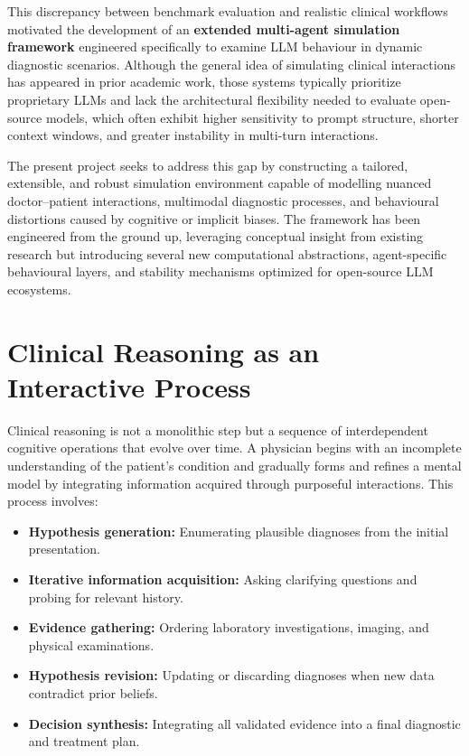 This discrepancy between benchmark evaluation and realistic clinical workflows motivated the development of an \textbf{extended multi-agent simulation framework} engineered specifically to examine LLM behaviour in dynamic diagnostic scenarios. Although the general idea of simulating clinical interactions has appeared in prior academic work, those systems typically prioritize proprietary LLMs and lack the architectural flexibility needed to evaluate open-source models, which often exhibit higher sensitivity to prompt structure, shorter context windows, and greater instability in multi-turn interactions.

The present project seeks to address this gap by constructing a tailored, extensible, and robust simulation environment capable of modelling nuanced doctor–patient interactions, multimodal diagnostic processes, and behavioural distortions caused by cognitive or implicit biases. The framework has been engineered from the ground up, leveraging conceptual insight from existing research but introducing several new computational abstractions, agent-specific behavioural layers, and stability mechanisms optimized for open-source LLM ecosystems.

\section{Clinical Reasoning as an Interactive Process}

Clinical reasoning is not a monolithic step but a sequence of interdependent cognitive operations that evolve over time. A physician begins with an incomplete understanding of the patient's condition and gradually forms and refines a mental model by integrating information acquired through purposeful interactions. This process involves:

\begin{itemize}
    \item \textbf{Hypothesis generation:} Enumerating plausible diagnoses from the initial presentation.
    \item \textbf{Iterative information acquisition:} Asking clarifying questions and probing for relevant history.
    \item \textbf{Evidence gathering:} Ordering laboratory investigations, imaging, and physical examinations.
    \item \textbf{Hypothesis revision:} Updating or discarding diagnoses when new data contradict prior beliefs.
    \item \textbf{Decision synthesis:} Integrating all validated evidence into a final diagnostic and treatment plan.
\end{itemize}

